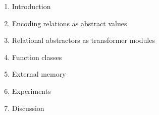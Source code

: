 \begin{enumerate}
    \item Introduction
    \item Encoding relations as abstract values
    \item Relational abstractors as transformer modules
    \item Function classes 
    \item External memory 
    \item Experiments
    \item Discussion
\end{enumerate}
